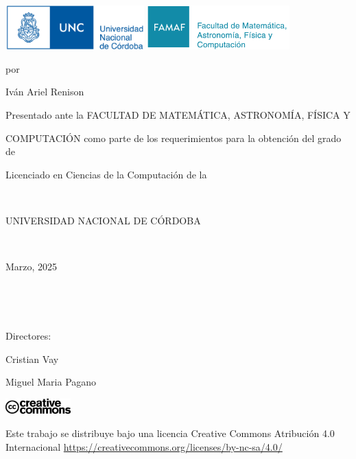 \begin{center}
  \thispagestyle{empty} %

  \vspace{0.5cm}

  \begin{minipage}[t]{\textwidth}
      \raggedright
      \includegraphics[height=1.7cm]{logos/unc.jpg} %
      \hfill
      \includegraphics[height=1.7cm]{logos/famaf.png} %
  \end{minipage}

  \vspace{3cm} %

  \begin{huge}
    \textbf{\tituloTesis}
  \end{huge}

  \vspace{0.3cm}

  por

  {\Large Iván Ariel Renison}

  \vspace{2cm}

  Presentado ante la FACULTAD DE MATEMÁTICA, ASTRONOMÍA, FÍSICA Y

  COMPUTACIÓN como parte de los requerimientos para la obtención del grado de

  Licenciado en Ciencias de la Computación de la

  \

  UNIVERSIDAD NACIONAL DE CÓRDOBA

  \

  Marzo, 2025

  \

  \

  \begin{large}
    Directores:

    Cristian Vay

    Miguel Maria Pagano
  \end{large}


  \vfill

  \includegraphics[height=0.6cm]{logos/cc.png}

  Este trabajo se distribuye bajo una licencia Creative Commons
  Atribución 4.0 Internacional \href{https://creativecommons.org/licenses/by-nc-sa/4.0/}{https://creativecommons.org/licenses/by-nc-sa/4.0/}

  \vspace{0.5cm}
\end{center}
\newpage
